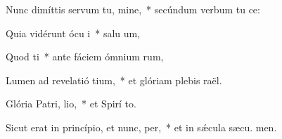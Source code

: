 \item Nunc dimíttis servum tu, mine,~* secúndum verbum tu  ce:
\item Quia vidérunt ócu i~* salu um,
\item Quod ti~* ante fáciem ómnium rum,
\item Lumen ad revelatió tium,~* et glóriam plebis  raël.
\item Glória Patri,  lio,~* et Spirí to.
\item Sicut erat in princípio, et nunc,  per,~* et in sǽcula sæcu. men.
